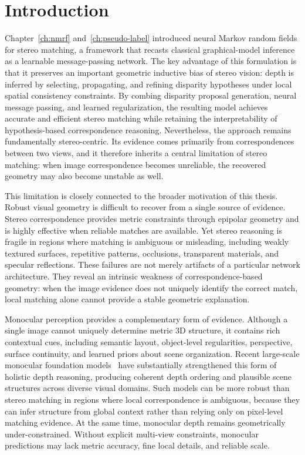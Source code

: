 \section{Introduction}
Chapter~\ref{ch:nmrf} and~\ref{ch:pseudo-label} introduced neural Markov random fields for stereo matching, a framework that recasts classical graphical-model inference as a learnable message-passing network.
The key advantage of this formulation is that it preserves an important geometric inductive bias of stereo vision: depth is inferred by selecting, propagating, and refining disparity hypotheses under local spatial consistency constraints.
By combing disparity proposal generation, neural message passing, and learned regularization, the resulting model achieves accurate and efficient stereo matching while retaining the interpretability of hypothesis-based correspondence reasoning.
Nevertheless, the approach remains fundamentally stereo-centric.
Its evidence comes primarily from correspondences between two views, and it therefore inherits a central limitation of stereo matching: when image correspondence becomes unreliable, the recovered geometry may also become unstable as well.

This limitation is closely connected to the broader motivation of this thesis.
Robust visual geometry is difficult to recover from a single source of evidence.
Stereo correspondence provides metric constraints through epipolar geometry and is highly effective when reliable matches are available.
Yet stereo reasoning is fragile in regions where matching is ambiguous or misleading, including weakly textured surfaces, repetitive patterns, occlusions, transparent materials, and specular reflections.
These failures are not merely artifacts of a particular network architecture.
They reveal an intrinsic weakness of correspondence-based geometry: when the image evidence does not uniquely identify the correct match, local matching alone cannot provide a stable geometric explanation.

Monocular perception provides a complementary form of evidence.
Although a single image cannot uniquely determine metric 3D structure, it contains rich contextual cues, including semantic layout, object-level regularities, perspective, surface continuity, and learned priors about scene organization.
Recent large-scale monocular foundation models~\cite{ranftl2020towards,ke2023repurposing,depth_anything_v1,piccinelli2024unidepth} have substantially strengthened this form of holistic depth reasoning, producing coherent depth ordering and plausible scene  structures across diverse visual domains.
Such models can be more robust than stereo matching in regions where local correspondence is ambiguous, because they can infer structure from global context rather than relying only on pixel-level matching evidence.
At the same time, monocular depth remains geometrically under-constrained.
Without explicit multi-view constraints, monocular predictions may lack metric accuracy, fine local details, and reliable scale.

